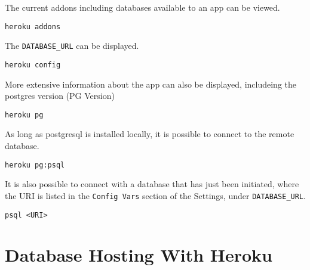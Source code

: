 \documentclass[]{book}
\begin{document}
The current addons including databases available to an app can be
viewed.

\begin{verbatim}
heroku addons
\end{verbatim}

The \texttt{DATABASE\_URL} can be displayed.

\begin{verbatim}
heroku config
\end{verbatim}

More extensive information about the app can also be displayed,
includeing the postgres version (PG Version)

\begin{verbatim}
heroku pg
\end{verbatim}

As long as postgresql is installed locally, it is possible to connect to
the remote database.

\begin{verbatim}
heroku pg:psql
\end{verbatim}

It is also possible to connect with a database that has just been
initiated, where the URI is listed in the \texttt{Config\ Vars} section
of the Settings, under \texttt{DATABASE\_URL}.

\begin{verbatim}
psql <URI>
\end{verbatim}

\section{Database Hosting With
Heroku}\label{database-hosting-with-heroku}
\end{document}
